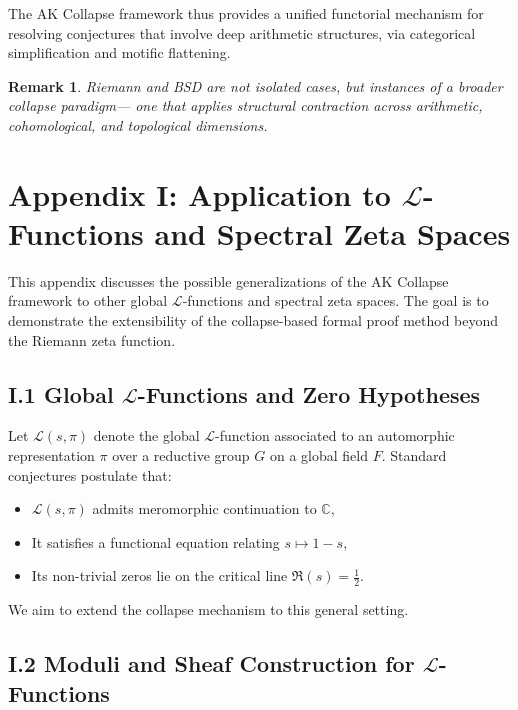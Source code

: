 \documentclass[11pt]{article}
\newtheorem{remark}[theorem]{Remark}
\begin{document}
The AK Collapse framework thus provides a unified functorial mechanism for resolving conjectures that involve deep arithmetic structures,  
via categorical simplification and motific flattening.

\begin{remark}
Riemann and BSD are not isolated cases, but instances of a broader collapse paradigm—  
one that applies structural contraction across arithmetic, cohomological, and topological dimensions.
\end{remark}



\section*{Appendix I: Application to $\mathcal{L}$-Functions and Spectral Zeta Spaces}

This appendix discusses the possible generalizations of the AK Collapse framework to other global $\mathcal{L}$-functions and spectral zeta spaces.  
The goal is to demonstrate the extensibility of the collapse-based formal proof method beyond the Riemann zeta function.

\subsection*{I.1 Global $\mathcal{L}$-Functions and Zero Hypotheses}

Let $\mathcal{L}(s, \pi)$ denote the global $\mathcal{L}$-function associated to an automorphic representation $\pi$ over a reductive group $G$  
on a global field $F$. Standard conjectures postulate that:

\begin{itemize}
    \item $\mathcal{L}(s, \pi)$ admits meromorphic continuation to $\mathbb{C}$,
    \item It satisfies a functional equation relating $s \mapsto 1-s$,
    \item Its non-trivial zeros lie on the critical line $\Re(s) = \tfrac{1}{2}$.
\end{itemize}

We aim to extend the collapse mechanism to this general setting.

\subsection*{I.2 Moduli and Sheaf Construction for $\mathcal{L}$-Functions}
\end{document}

